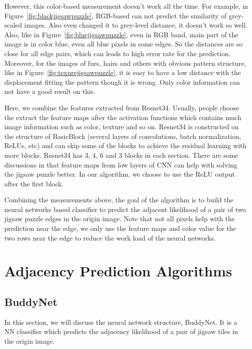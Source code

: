 \documentclass{article}
\begin{document}
However, this color-based measurement doesn't work all the time. For example, in Figure~\ref{fig:blackjigsawpuzzle}, RGB-based can not predict the similarity of grey-scaled images. Also even changed it to grey-level distance, it doesn't work so well. Also, like in Figure~\ref{fig:bluejigsawpuzzle}, even in RGB band, main part of the image is in color blue, even all blue pixels in some edges. So the distances are so close for all edge pairs, which can leads to high error rate for the prediction. Moreover, for the images of furs, hairs and others with obvious pattern structure, like in Figure~\ref{fig:texurejigsawpuzzle}, it is easy to have a low distance with the displacement fitting the pattern though it is wrong. Only color information can not have a good result on this.

Here, we combine the features extracted from Resnet34\cite{he2016deep}. Usually, people choose the extract the feature maps after the activation functions which contains much image information such as color, texture and so on. Resnet34 is constructed on the structure of BasicBlock (several layers of convolutions, batch normalization, ReLUs, etc) and can skip some of the blocks to achieve the residual learning with more blocks. Resnet34 has 3, 4, 6 and 3 blocks in each section. There are some discussions in \cite{noroozi2016unsupervised} that feature maps from low layers of CNN can help with solving the jigsaw puzzle better. In our algorithm, we choose to use the ReLU output after the first block.

Combining the measurements above, the goal of the algorithm is to build the neural networks based classifier to predict the adjacent likelihood of a pair of two jigsaw puzzle edges in the origin image. Note that not all pixels help with the prediction near the edge, we only use the feature maps and color value for the two rows near the edge to reduce the work load of the neural networks.

\section{Adjacency Prediction Algorithms}

\subsection{BuddyNet}

In this section, we will discuss the neural network structure, BuddyNet. It is a NN classifier which predicts the adjacency likelihood of a pair of jigsaw tiles in the origin image.
\end{document}
